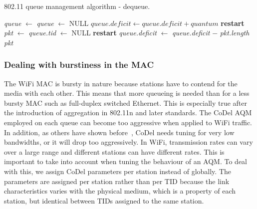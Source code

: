 \documentclass[english]{scrartcl}
\begin{document}
\begin{algorithm}[t]
\caption{\small 802.11 queue management algorithm - dequeue.}
\label{alg:fq-codel-deq}
\begin{algorithmic}[1]
\small
{} \label{ln:beg-deq}
   \label{ln:beg-sel-q}
    \State \emph{queue} $\gets$ 
    \State \emph{queue} $\gets$ 
  \Else
    \State \Return NULL
  \EndIf \label{ln:end-sel-q}
   \label{ln:beg-chk-q-def}
    \State $\textit{queue.deficit} \gets \textit{queue.deficit} + \textit{quantum}$
    \State {}
    \State \textbf{restart}
  \EndIf \label{ln:end-chk-q-def}
  \State \emph{pkt} $\gets$  \label{ln:deq-pkt}
    \label{ln:beg-q-empt}
      \State {}
    \Else
      \State {}
      \State \emph{queue.tid} $\gets$ NULL
    \EndIf
    \State \textbf{restart}
  \EndIf \label{ln:end-q-empt}
  \State \emph{queue.deficit} $\gets$ \emph{queue.deficit} $-$ \emph{pkt.length} \label{ln:dec-q-def}
  \State \Return \emph{pkt} \label{ln:ret-pkt}
\EndFunction \label{ln:end-deq}
\end{algorithmic}
\end{algorithm}



\subsubsection{Dealing with burstiness in the MAC}
\label{sec:bursty-mac}
The WiFi MAC is bursty in nature because stations have to contend for the media
with each other. This means that more queueing is needed than for a less bursty
MAC such as full-duplex switched Ethernet. This is especially true after the
introduction of aggregation in 802.11n and later standards. The CoDel AQM
employed on each queue can become too aggressive when applied to WiFi
traffic. In addition, as others have shown before \cite{good-bad-wifi,much-ado},
CoDel needs tuning for very low bandwidths, or it will drop too aggressively. In
WiFi, transmission rates can vary over a large range and different stations can
have different rates. This is important to take into account when tuning the
behaviour of an AQM. To deal with this, we assign CoDel parameters per station
instead of globally. The parameters are assigned per station rather than per TID
because the link characteristics varies with the physical medium, which is a
property of each station, but identical between TIDs assigned to the same
station.
\end{document}
